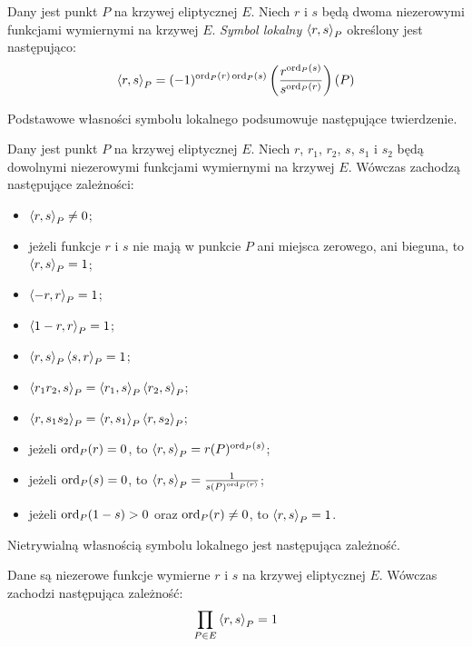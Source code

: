 \begin{definition}
Dany jest punkt $P$ na krzywej eliptycznej $E$.
Niech $r$ i $s$ będą dwoma niezerowymi funkcjami wymiernymi na krzywej $E$.
\emph{Symbol lokalny $\left\langle r , s \right\rangle_{P}$}
określony jest następująco:
\begin{equation}
\left\langle r , s \right\rangle_{P} =
(-1)^{\operatorname{ord}_P(r)\operatorname{ord}_P(s)}\left(\frac{r^{\operatorname{ord}_P(s)}}{s^{\operatorname{ord}_P(r)}}\right)(P)
\end{equation}
\end{definition}

\noindent
Podstawowe własności symbolu lokalnego podsumowuje następujące twierdzenie.

\begin{theorem}
Dany jest punkt $P$ na krzywej eliptycznej $E$.
Niech $r$, $r_1$, $r_2$, $s$, $s_1$ i $s_2$
będą dowolnymi niezerowymi funkcjami wymiernymi na krzywej $E$.
Wówczas zachodzą następujące zależności:
\begin{itemize}
\item
$\left\langle r , s \right\rangle_{P} \neq 0$;
\item
jeżeli funkcje $r$ i $s$ nie mają w punkcie $P$
ani miejsca zerowego, ani bieguna,
to $\left\langle r , s \right\rangle_{P} = 1$;
\item
$\left\langle -r , r \right\rangle_{P} = 1$;
\item
$\left\langle 1-r , r \right\rangle_{P} = 1$;
\item
$\left\langle r , s \right\rangle_{P}\left\langle s , r \right\rangle_{P} = 1$;
\item
$\left\langle r_1r_2 , s \right\rangle_{P} = \left\langle r_1 , s \right\rangle_{P}\left\langle r_2 , s \right\rangle_{P}$;
\item
$\left\langle r , s_1s_2 \right\rangle_{P} = \left\langle r , s_1 \right\rangle_{P}\left\langle r , s_2 \right\rangle_{P}$;
\item
jeżeli $\operatorname{ord}_P(r) = 0$, to $\left\langle r , s \right\rangle_{P} = r(P)^{\operatorname{ord}_P(s)}$;
\item
jeżeli $\operatorname{ord}_P(s) = 0$, to $\left\langle r , s \right\rangle_{P} = \frac{1}{s(P)^{\operatorname{ord}_P(r)}}$;
\item
jeżeli $\operatorname{ord}_P(1-s) > 0$ oraz $\operatorname{ord}_P(r) \neq 0$, to $\left\langle r , s \right\rangle_{P} = 1$.
\end{itemize}
\end{theorem}

\noindent
Nietrywialną własnością symbolu lokalnego jest następująca zależność.

\begin{theorem}
Dane są niezerowe funkcje wymierne $r$ i $s$ na krzywej eliptycznej $E$.
Wówczas zachodzi następująca zależność:
\begin{equation}
\prod_{P \in E} \left\langle r , s \right\rangle_{P} = 1
\end{equation}
\end{theorem}

